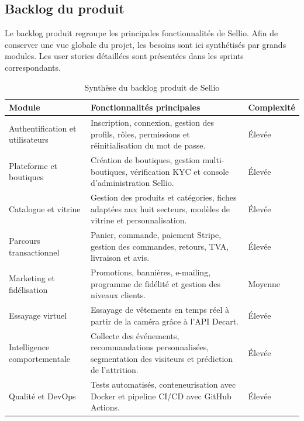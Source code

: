 \subsection{Backlog du produit}

Le backlog produit regroupe les principales fonctionnalités de Sellio. 
Afin de conserver une vue globale du projet, les besoins sont ici synthétisés 
par grands modules. Les user stories détaillées sont présentées dans les sprints correspondants.

\begin{table}[H]
\centering
\renewcommand{\arraystretch}{1.3}
\begin{tabular}{|p{2.9cm}|p{9.5cm}|p{2.5cm}|}
\hline
\textbf{Module} & \textbf{Fonctionnalités principales} & \textbf{Complexité} \\
\hline

Authentification et utilisateurs &
Inscription, connexion, gestion des profils, rôles, permissions et réinitialisation du mot de passe. &
Élevée \\
\hline

Plateforme et boutiques &
Création de boutiques, gestion multi-boutiques, vérification KYC et console d'administration Sellio. &
Élevée \\
\hline

Catalogue et vitrine &
Gestion des produits et catégories, fiches adaptées aux huit secteurs, modèles de vitrine et personnalisation. &
Élevée \\
\hline

Parcours transactionnel &
Panier, commande, paiement Stripe, gestion des commandes, retours, TVA, livraison et avis. &
Élevée \\
\hline

Marketing et fidélisation &
Promotions, bannières, e-mailing, programme de fidélité et gestion des niveaux clients. &
Moyenne \\
\hline

Essayage virtuel &
Essayage de vêtements en temps réel à partir de la caméra grâce à l'API Decart. &
Élevée \\
\hline

Intelligence comportementale &
Collecte des événements, recommandations personnalisées, segmentation des visiteurs et prédiction de l'attrition. &
Élevée \\
\hline

Qualité et DevOps &
Tests automatisés, conteneurisation avec Docker et pipeline CI/CD avec GitHub Actions. &
Élevée \\
\hline

\end{tabular}
\caption{Synthèse du backlog produit de Sellio}
\label{tab:backlog-produit}
\end{table}


